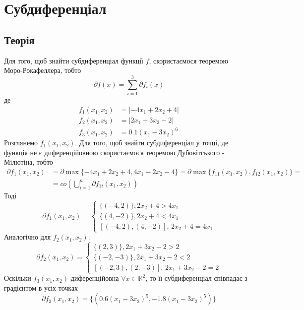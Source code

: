 \documentclass[a4paper, 14pt]{extarticle}
\begin{document}
\section{Субдиференціал}
\subsection{Теорія}
Для того, щоб знайти субдиференціал функції $f$,
скористаємося теоремою \\
Моро-Рокафеллера,
тобто 
\begin{equation*}
    \partial f(x) = \sum_{i=1}^3 \partial f_i(x)
\end{equation*}
де 
\begin{align*}
    f_1(x_1,x_2) &= |-4x_1+2x_2+4|\\
    f_2(x_1,x_2) &= |2x_1+3x_2-2|\\
    f_3(x_1,x_2) &= 0.1(x_1-3x_2)^6
\end{align*}
Розглянемо $f_1(x_1,x_2)$. Для того, щоб знайти субдиференціал 
у точці, де функція не є диференційовною
скористаємося теоремою Дубовітського - Мілютіна, тобто 
\begin{align*}
    \partial f_1(x_1,x_2)  
    &= \partial \max\{-4x_1+2x_2+4, 4x_1-2x_2-4\} = \partial
    \max\{f_{11}(x_1,x_2), f_{12}(x_1,x_2)\}=\\
    &= co\left(\bigcup_{i=1}^n \partial f_{1i}(x_1,x_2)\right)
\end{align*}
Тоді 
\begin{equation*}
    \partial f_1(x_1,x_2) = 
    \begin{cases}
        \{(-4,2)\}, 2x_2+4>4x_1\, \\
        \{(4,-2)\}, 2x_2+4<4x_1\, \\
        [(-4,2),(4,-2)],\, 2x_2 +4 =4x_1
    \end{cases}
\end{equation*}
Аналогічно для $f_2(x_1,x_2)$: 
\begin{equation*}
    \partial f_2(x_1,x_2) = 
    \begin{cases}
        \{(2,3)\}, 2x_1+3x_2-2>2\, \\
        \{(-2,-3)\}, 2x_1+3x_2-2<2\, \\
        [(-2,3),(2,-3)],\, 2x_1 +3x_2 -2 =2
    \end{cases}
\end{equation*}
Оскільки $f_3(x_1,x_2)$ диференційовна $\forall x\in\mathbb{R}^2$,
то її субдиференціал співпадає з градієнтом в усіх точках 
\begin{equation*}
    \partial f_3(x_1,x_2) = \{(0.6(x_1-3x_2)^5, -1.8(x_1-3x_2)^5)\}
\end{equation*}
\end{document}

